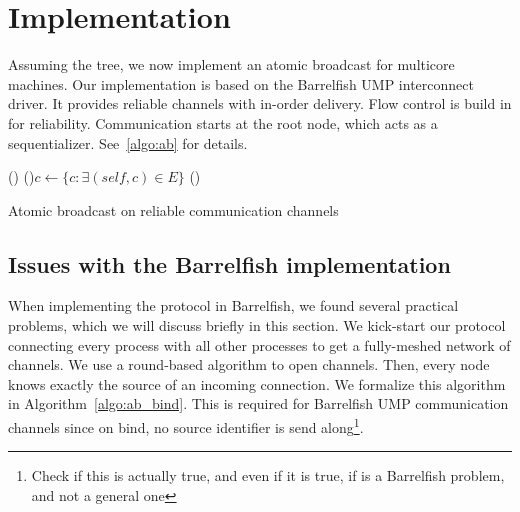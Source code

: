 \documentclass{article}
\begin{document}
\section{Implementation}

Assuming the tree, we now implement an atomic broadcast for multicore
machines. Our implementation is based on the Barrelfish UMP
interconnect driver. It provides reliable channels with in-order
delivery. Flow control is build in for reliability. Communication
starts at the root node, which acts as a
sequentializer. See~\ref{algo:ab} for details.

\newcommand{\textc}[1]{{\color{gray} {\footnotesize #1}}}
\begin{algorithm}[H]
%
%
%
%
%
%
%
  \BlankLine
  \Fn(){}{
    \For(){$c \leftarrow \{ c: \exists (self, c) \in E \} $}{
    }
    \waitchild{}\;
    \;
  }
  \BlankLine
  \Fn(){}{
  }
  \caption{Atomic broadcast on reliable communication channels}
  \label{algo:ab}

\end{algorithm}

\subsection{Issues with the Barrelfish implementation}

When implementing the protocol in Barrelfish, we found several
practical problems, which we will discuss briefly in this section.
We kick-start our protocol connecting every process with all other
processes to get a fully-meshed network of channels.
We use a round-based algorithm to open channels. Then, every node
knows exactly the source of an incoming connection. We formalize this
algorithm in Algorithm~\ref{algo:ab_bind}.
This is required for Barrelfish UMP communication channels since on
bind, no source identifier is send along\footnote{Check if this is
  actually true, and even if it is true, if is a Barrelfish problem,
  and not a general one}.
\end{document}
